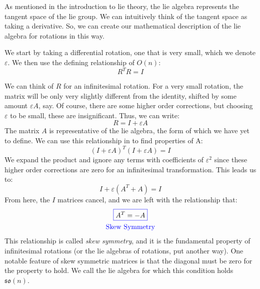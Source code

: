 As mentioned in the introduction to \gls{lie theory}, the \gls{lie algebra} represents the tangent space of the \gls{lie group}. We can intuitively think of the tangent space as taking a derivative. So, we can create our mathematical description of the \gls{lie algebra} for rotations in this way.

We start by taking a differential rotation, one that is very small, which we denote $\varepsilon$. We then use the defining relationship of $O(n)$:
\begin{equation}\label{eq:rotationDef}
    R^T R=I
\end{equation}

We can think of $R$ for an infinitesimal rotation. For a very small rotation, the matrix will be only very slightly different from the identity, shifted by some amount $\varepsilon A$, say. Of course, there are some higher order corrections, but choosing $\varepsilon$ to be small, these are insignificant. Thus, we can write:
$$R=I+\varepsilon A$$
The matrix $A$ is representative of the \gls{lie algebra}, the form of which we have yet to define. We can use this relationship in  to find properties of A:
$$(I+\varepsilon A)^T (I+\varepsilon A)=I$$
We expand the product and ignore any terms with coefficients of $\varepsilon^2$  since these higher order corrections are zero for an infinitesimal transformation. This leads us to:
$$I+\varepsilon(A^T +A)=I$$
From here, the $I$ matrices cancel, and we are left with the relationship that:
\begin{gather}
    \color{blue}\boxed{\color{black}A^T =-A}\\
    \color{blue}\mathrm{Skew \ Symmetry}
\end{gather}
This relationship is called \textit{skew symmetry}, and it is the fundamental property of infinitesimal rotations (or the \glspl{lie algebra} of rotations, put another way). One notable feature of skew symmetric matrices is that the diagonal must be zero for the property to hold. We call the \gls{lie algebra} for which this condition holds $\mathfrak{so}(n)$.


